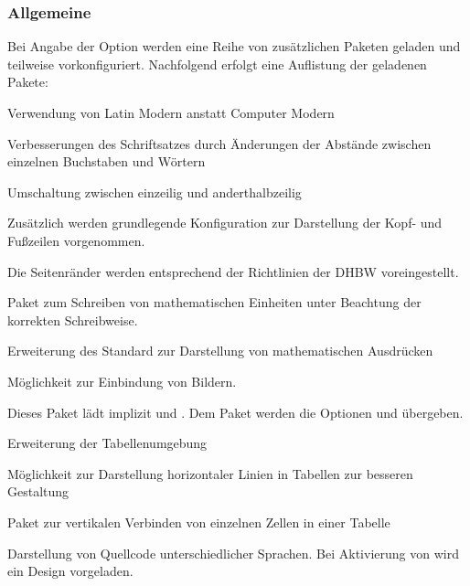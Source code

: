 \documentclass[babel=ngerman,highlight=false]{skdoc}
\begin{document}
            \subsubsection{Allgemeine}
                Bei Angabe der Option  werden eine Reihe von zusätzlichen Paketen geladen und teilweise vorkonfiguriert. Nachfolgend erfolgt eine Auflistung der geladenen Pakete:
                \begin{description}[itemsep=1pt, style=multiline, leftmargin=3cm]
                    \item [\pkg{lmodern}] Verwendung von Latin Modern anstatt Computer Modern
                    \item [\pkg{microtype}] Verbesserungen des Schriftsatzes durch Änderungen der Abstände zwischen einzelnen Buchstaben und Wörtern
                    \item [\pkg{setspace}] Umschaltung zwischen einzeilig und anderthalbzeilig
                    \item [\pkg{scrlayer-srcpage}] Zusätzlich werden grundlegende Konfiguration zur Darstellung der Kopf- und Fußzeilen vorgenommen.
                    \item [\pkg{geometry}] Die Seitenränder werden entsprechend der Richtlinien der DHBW voreingestellt.
                    \item [\pkg{siunitx}] Paket zum Schreiben von mathematischen Einheiten unter Beachtung der korrekten Schreibweise.
                    \item [\pkg{mathtools}] Erweiterung des Standard zur Darstellung von mathematischen Ausdrücken
                    \item [\pkg{graphicx}] Möglichkeit zur Einbindung von Bildern.
                    \item [\pkg{tcolobox}] Dieses Paket lädt implizit  und . Dem Paket  werden die Optionen  und  übergeben.
                    \item [\pkg{tabularx}] Erweiterung der Tabellenumgebung
                    \item [\pkg{booktabs}] Möglichkeit zur Darstellung horizontaler Linien in Tabellen zur besseren Gestaltung
                    \item [\pkg{multirow}] Paket zur vertikalen Verbinden von einzelnen Zellen in einer Tabelle
                    \item [\pkg{listings}] Darstellung von Quellcode unterschiedlicher Sprachen. Bei Aktivierung von  wird ein Design vorgeladen.
                \end{description}
\end{document}
